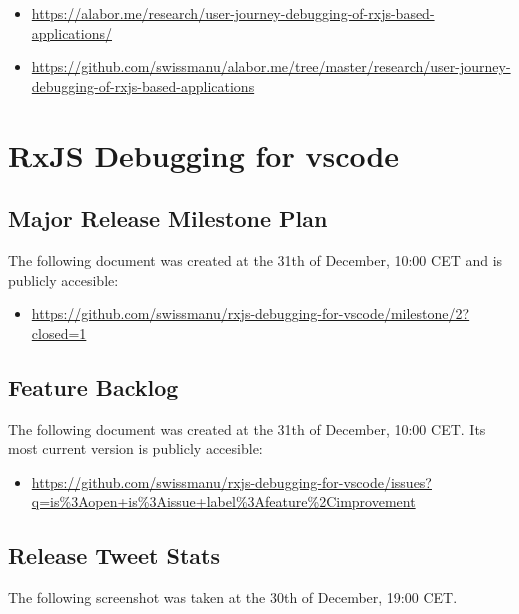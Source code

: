 \begin{itemize}
  \item \url{https://alabor.me/research/user-journey-debugging-of-rxjs-based-applications/}
  \item \url{https://github.com/swissmanu/alabor.me/tree/master/research/user-journey-debugging-of-rxjs-based-applications}
\end{itemize}






\section{RxJS Debugging for vscode}


\subsection{Major Release Milestone Plan}
\label{sec:major-milestone}
The following document was created at the 31th of December, 10:00 CET and is publicly accesible:

\begin{itemize}
  \item \url{https://github.com/swissmanu/rxjs-debugging-for-vscode/milestone/2?closed=1}
\end{itemize}






\subsection{Feature Backlog}
\label{sec:feature-backlog}
The following document was created at the 31th of December, 10:00 CET. Its most current version is publicly accesible:

\begin{itemize}
  \item \url{https://github.com/swissmanu/rxjs-debugging-for-vscode/issues?q=is%3Aopen+is%3Aissue+label%3Afeature%2Cimprovement}
\end{itemize}




\subsection{Release Tweet Stats}
\label{sec:release-tweet-stats}
The following screenshot was taken at the 30th of December, 19:00 CET.

